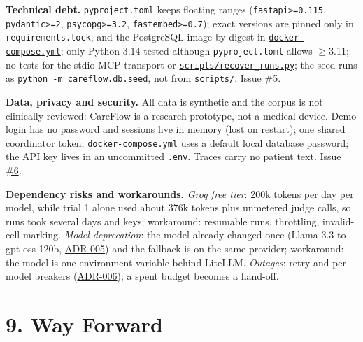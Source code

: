 \documentclass[10pt,a4paper]{article}
\newcommand{\repourl}{https://github.com/saideepaksana/careflow}
\newcommand{\rev}{cs5903-final-2026}
\newcommand{\file}[1]{\href{\repourl/blob/\rev/#1}{\nolinkurl{#1}}}
\newcommand{\adr}[1]{\href{\repourl/blob/\rev/docs/Architecture_Decision_Records.md}{ADR-#1}}
\newcommand{\issue}[1]{\href{\repourl/issues/#1}{\##1}}
\newcommand{\cmd}[1]{\nolinkurl{#1}}
\begin{document}
\textbf{Technical debt.} \texttt{pyproject.toml} keeps floating ranges (\texttt{fastapi>=0.115}, \texttt{pydantic>=2}, \texttt{psycopg>=3.2}, \texttt{fastembed>=0.7}); exact versions are pinned only in \texttt{requirements.lock}, and the PostgreSQL image by digest in \file{docker-compose.yml}; only Python 3.14 tested although \texttt{pyproject.toml} allows $\geq$3.11; no tests for the stdio MCP transport or \file{scripts/recover_runs.py}; the seed runs as \cmd{python -m careflow.db.seed}, not from \texttt{scripts/}. Issue \issue{5}.

\textbf{Data, privacy and security.} All data is synthetic and the corpus is not clinically reviewed: CareFlow is a research prototype, not a medical device. Demo login has no password and sessions live in memory (lost on restart); one shared coordinator token; \file{docker-compose.yml} uses a default local database password; the API key lives in an uncommitted \texttt{.env}. Traces carry no patient text. Issue \issue{6}.

\textbf{Dependency risks and workarounds.} \emph{Groq free tier}: 200k tokens per day per model, while trial 1 alone used about 376k tokens plus unmetered judge calls, so runs took several days and keys; workaround: resumable runs, throttling, invalid-cell marking. \emph{Model deprecation}: the model already changed once (Llama 3.3 to gpt-oss-120b, \adr{005}) and the fallback is on the same provider; workaround: the model is one environment variable behind LiteLLM. \emph{Outages}: retry and per-model breakers (\adr{006}); a spent budget becomes a hand-off.

\FloatBarrier
\section*{9. Way Forward}
\end{document}
